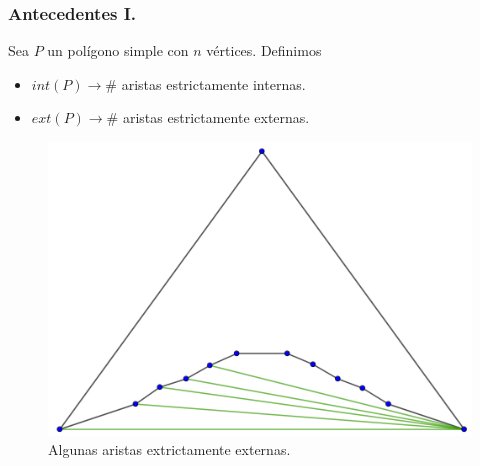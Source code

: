 \begin{frame}
  \frametitle{Antecedentes I.}    
  Sea $P$ un polígono simple con $n$ vértices. Definimos
  \begin{itemize}
  \item $int(P) \rightarrow \#$ aristas estrictamente internas. 
  \item $ext(P) \rightarrow \#$ aristas estrictamente externas.
  \end{itemize}
  \begin{figure}
    \centering
    \includegraphics[width=.35 \paperwidth]{./images/Ejemplo3.png}
    \caption*{Algunas aristas extrictamente externas.}
  \end{figure}
\end{frame}

